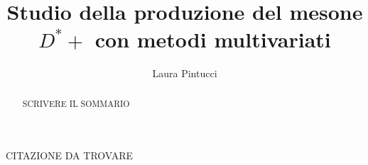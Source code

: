 \documentclass[a4paper, twoside]{report}
\title{Studio della produzione del mesone $D^*+$ con metodi multivariati}
\author{Laura Pintucci}
\begin{document}

\thispagestyle{empty} 

\cleardoublepage



\thispagestyle{empty} 
\begin{flushright}%
\null {}

CITAZIONE DA TROVARE

\null
\end{flushright}





\begin{abstract}
SCRIVERE IL SOMMARIO
\end{abstract}


\tableofcontents
\listoffigures
\listoftables












\end{document}

